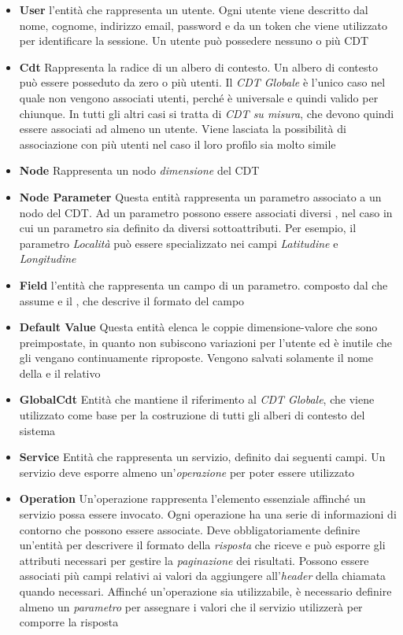 \begin{itemize}
	\item \textbf{User} \upe l'entità che rappresenta un utente. Ogni utente viene descritto dal nome, cognome, indirizzo email, password e da un token che viene utilizzato per identificare la sessione. Un utente può possedere nessuno o più CDT
	\item \textbf{Cdt} Rappresenta la radice di un albero di contesto. Un albero di contesto può essere posseduto da zero o più utenti. Il \emph{CDT Globale} è l'unico caso nel quale non vengono associati utenti, perché è universale e quindi valido per chiunque. In tutti gli altri casi si tratta di \emph{CDT su misura}, che devono quindi essere associati ad almeno un utente. Viene lasciata la possibilità di associazione con più utenti nel caso il loro profilo sia molto simile
	\item \textbf{Node} Rappresenta un nodo \emph{dimensione} del CDT
	\item \textbf{Node Parameter} Questa entità rappresenta un parametro associato a un nodo del CDT. Ad un parametro possono essere associati diversi , nel caso in cui un parametro sia definito da diversi sottoattributi. Per esempio, il parametro \emph{Località} può essere specializzato nei campi \emph{Latitudine} e \emph{Longitudine}
	\item \textbf{Field} \upe l'entità che rappresenta un campo di un parametro. \upe composto dal  che assume e il , che descrive il formato del campo
	\item \textbf{Default Value} Questa entità elenca le coppie dimensione-valore che sono preimpostate, in quanto non subiscono variazioni per l'utente ed è inutile che gli vengano continuamente riproposte. Vengono salvati solamente il nome della  e il relativo 
	\item \textbf{GlobalCdt} Entità che mantiene il riferimento al \emph{CDT Globale}, che viene utilizzato come base per la costruzione di tutti gli alberi di contesto del sistema
	\item \textbf{Service} Entità che rappresenta un servizio, definito dai seguenti campi. Un servizio deve esporre almeno un'\emph{operazione} per poter essere utilizzato
	\item \textbf{Operation} Un'operazione rappresenta l'elemento essenziale affinché un servizio possa essere invocato. Ogni operazione ha una serie di informazioni di contorno che possono essere associate. Deve obbligatoriamente definire un'entità per descrivere il formato della \emph{risposta} che riceve e può esporre gli attributi necessari per gestire la \emph{paginazione} dei risultati. Possono essere associati più campi relativi ai valori da aggiungere all'\emph{header} della chiamata quando necessari. Affinché un'operazione sia utilizzabile, è necessario definire almeno un \emph{parametro} per assegnare i valori che il servizio utilizzerà per comporre la risposta

\end{itemize}
